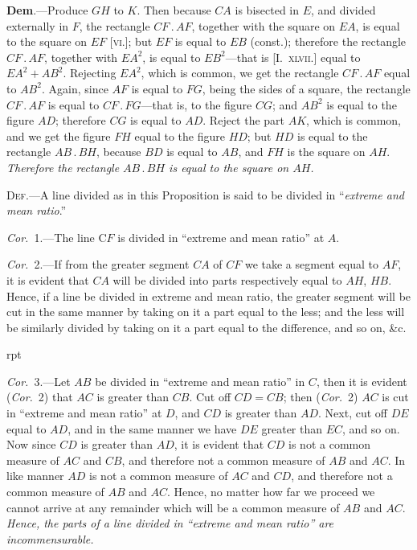 \documentclass[oneside]{book}
\newcommand\imgflow[3]{
\setcounter{wrapwidth}{#1}
\begin{wrapfigure}[#2]{r}{\value{wrapwidth}pt}
\begin{center}
\vspace{-0.3in}
\end{center}
\end{wrapfigure}
}
\begin{document}
\textbf{Dem}.---Produce $GH$ to $K$. Then because $CA$ is bisected
in $E$, and divided externally
in $F$, the rectangle $CF\,.\,AF$, together
with the square on $EA$, is equal to the
square on $EF$ [\textsc{vi}.]; but $EF$ is equal
to $EB$ (const.); therefore the rectangle
$CF\,.\,AF$, together with $EA^2$, is
equal to $EB^2$---that is [I.\ \textsc{xlvii}.] equal
to $EA^2 + AB^2$. Rejecting $EA^2$, which
is common, we get the rectangle
$CF\,.\,AF$ equal to $AB^2$. Again, since
$AF$ is equal to $FG$, being the sides of
a square, the rectangle $CF\,.\,AF$ is equal to $CF\,.\,FG$---that
is, to the figure $CG$; and $AB^{2}$ is equal to the figure
$AD$; therefore $CG$ is equal to $AD$. Reject the part
$AK$, which is common, and we get the figure $FH$ equal
to the figure $HD$; but $HD$ is equal to the rectangle
$AB\,.\,BH$, because $BD$ is equal to $AB$, and $FH$ is the
square on $AH$. \emph{Therefore the rectangle $AB\,.\,BH$ is
equal to the square on $AH$.}

\textsc{Def}.---A line divided as in this Proposition is said to
be divided in ``\emph{extreme and mean ratio}.''

\emph{Cor.}\ 1.---The line C$F$ is divided in ``extreme and
mean ratio'' at $A$.

\emph{Cor.}\ 2.---If from the greater segment $CA$ of $CF$ we
take a segment equal to $AF$, it is evident that $CA$ will
be divided into parts respectively equal to $AH$, $HB$.
Hence, if a line be divided in extreme and mean ratio,
the greater segment will be cut in the same manner
by taking on it a part equal to the less; and the less
will be similarly divided by taking on it a part equal
to the difference, and so on, \&c.

\imgflow{138}{3}{f094}

\emph{Cor.}\ 3.---Let $AB$ be divided in ``extreme and mean
ratio'' in $C$, then it is evident
(\emph{Cor.}\ 2) that $AC$ is greater
than $CB$. Cut off $CD = CB$;
then (\emph{Cor.}\ 2) $AC$ is cut in ``extreme and mean ratio'' at
$D$, and $CD$ is greater than $AD$. Next, cut off $DE$ equal
to $AD$, and in the same manner we have $DE$ greater
than $EC$, and so on. Now since $CD$ is greater than $AD$,
it is evident that $CD$ is not a common measure of $AC$
and $CB$, and therefore not a common measure of $AB$
and $AC$. In like manner $AD$ is not a common measure
of $AC$ and $CD$, and therefore not a common measure of
$AB$ and $AC$. Hence, no matter how far we proceed
we cannot arrive at any remainder which will be a
common measure of $AB$ and $AC$. \textit{Hence, the parts of a
line divided in ``extreme and mean ratio''
are incommensurable.}
\end{document}
